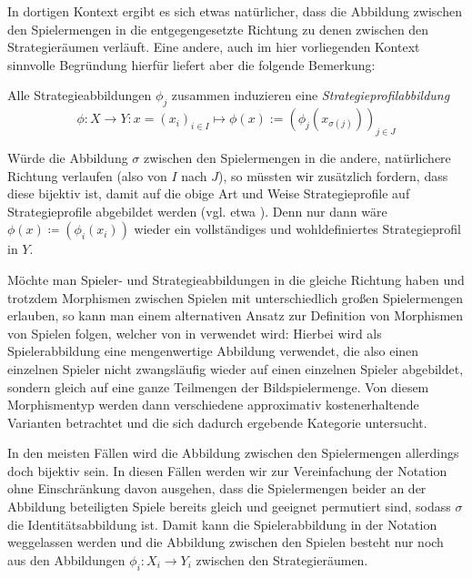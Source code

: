 In dortigen Kontext ergibt es sich etwas natürlicher, dass die Abbildung zwischen den Spielermengen in die entgegengesetzte Richtung zu denen zwischen den Strategieräumen verläuft. Eine andere, auch im hier vorliegenden Kontext sinnvolle Begründung hierfür liefert aber die folgende Bemerkung:

\begin{bem}
	Alle Strategieabbildungen $\phi_j$ zusammen induzieren eine \emph{Strategieprofilabbildung}
	\[\phi: X \to Y: x=(x_i)_{i\in I} \mapsto \phi(x) := \left(\phi_j(x_{\sigma(j)})\right)_{j \in J} \]
\end{bem}

Würde die Abbildung $\sigma$ zwischen den Spielermengen in die andere, \glqq natürlichere\grqq{} Richtung verlaufen (also von $I$ nach $J$), so müssten wir zusätzlich fordern, dass diese bijektiv ist, damit auf die obige Art und Weise Strategieprofile auf Strategieprofile abgebildet werden (vgl. etwa \cite{CatGameTheory}). Denn nur dann wäre $\phi(x) \coloneqq \left(\phi_i(x_i)\right)$ wieder ein vollständiges und wohldefiniertes Strategieprofil in $Y$.

\begin{bem}
	Möchte man Spieler- und Strategieabbildungen in die gleiche Richtung haben und trotzdem Morphismen zwischen Spielen mit unterschiedlich großen Spielermengen erlauben, so kann man einem alternativen Ansatz zur Definition von Morphismen von Spielen folgen, welcher von \citeauthor{Foundations} in \cite[Kapitel 1, Abschnitt 1.14]{Foundations} verwendet wird: Hierbei wird als Spielerabbildung eine mengenwertige Abbildung verwendet, die also einen einzelnen Spieler nicht zwangsläufig wieder auf einen einzelnen Spieler abgebildet, sondern gleich auf eine ganze Teilmengen der Bildspielermenge. Von diesem Morphismentyp werden dann verschiedene \glqq approximativ kostenerhaltende\grqq{} Varianten betrachtet und die sich dadurch ergebende Kategorie untersucht.
\end{bem}

\begin{notation}
	In den meisten Fällen wird die Abbildung zwischen den Spielermengen allerdings doch bijektiv sein. In diesen Fällen werden wir zur Vereinfachung der Notation ohne Einschränkung davon ausgehen, dass die Spielermengen beider an der Abbildung beteiligten Spiele bereits gleich und geeignet permutiert sind, sodass $\sigma$ die Identitätsabbildung ist. Damit kann die Spielerabbildung in der Notation weggelassen werden und die Abbildung zwischen den Spielen besteht nur noch aus den Abbildungen $\phi_i: X_i \to Y_i$ zwischen den Strategieräumen.
\end{notation}

